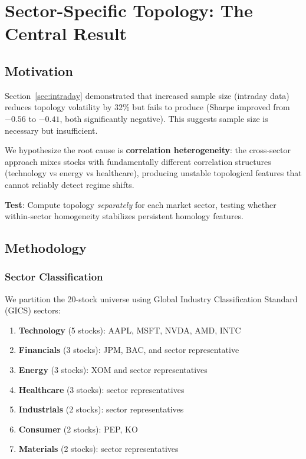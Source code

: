 
\section{Sector-Specific Topology: The Central Result}
\label{sec:sector}

\subsection{Motivation}

Section~\ref{sec:intraday} demonstrated that increased sample size (intraday data) reduces topology volatility by 32\% but fails to produce \positiverisk{} (Sharpe improved from $-0.56$ to $-0.41$, both significantly negative). This suggests sample size is necessary but insufficient.

We hypothesize the root cause is \textbf{correlation heterogeneity}: the cross-sector approach mixes stocks with fundamentally different correlation structures (technology vs energy vs healthcare), producing unstable topological features that cannot reliably detect regime shifts.

\textbf{Test}:  Compute topology \textit{separately} for each market sector, testing whether within-sector homogeneity stabilizes persistent homology features.

\subsection{Methodology}

\subsubsection{Sector Classification}

We partition the 20-stock universe using Global Industry Classification Standard (GICS) sectors:

\begin{enumerate}
    \item \textbf{Technology} (5 stocks): AAPL, MSFT, NVDA, AMD, INTC
    \item \textbf{Financials} (3 stocks): JPM, BAC, and sector representative
    \item \textbf{Energy} (3 stocks): XOM and sector representatives
    \item \textbf{Healthcare} (3 stocks): sector representatives
    \item \textbf{Industrials} (2 stocks): sector representatives
    \item \textbf{Consumer} (2 stocks): PEP, KO
    \item \textbf{Materials} (2 stocks): sector representatives
\end{enumerate}

